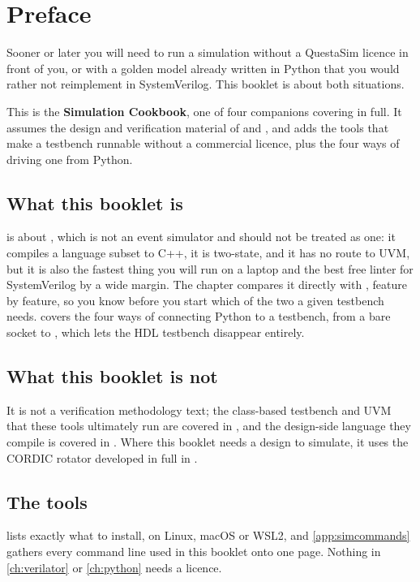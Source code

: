 \chapter*{Preface}

Sooner or later you will need to run a simulation without a QuestaSim
licence in front of you, or with a golden model already written in Python
that you would rather not reimplement in SystemVerilog. This booklet is
about both situations.

This is the \textbf{Simulation Cookbook}, one of four companions covering
 in full. It assumes the design and
verification material of  and , and adds
the tools that make a testbench runnable without a commercial licence, plus
the four ways of driving one from Python.

\section*{What this booklet is}

 is about , which is not an event
simulator and should not be treated as one: it compiles a language subset to
C++, it is two-state, and it has no route to UVM, but it is also the fastest
thing you will run on a laptop and the best free linter for SystemVerilog by
a wide margin. The chapter compares it directly with ,
feature by feature, so you know before you start which of the two a given
testbench needs.  covers the four ways of connecting Python
to a testbench, from a bare socket to , which lets the HDL
testbench disappear entirely.

\section*{What this booklet is not}

It is not a verification methodology text; the class-based testbench and UVM
that these tools ultimately run are covered in , and the
design-side language they compile is covered in . Where this
booklet needs a design to simulate, it uses the CORDIC rotator developed in
full in .

\section*{The tools}

 lists exactly what to install, on Linux, macOS or WSL2,
and \cref{app:simcommands} gathers every command line used in this booklet
onto one page. Nothing in \cref{ch:verilator} or \cref{ch:python} needs a
licence.
